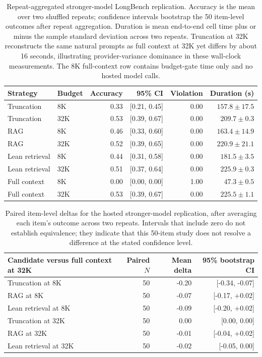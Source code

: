 \documentclass[11pt]{article}
\begin{document}
\begin{table}[t]
\centering
\small
\setlength{\tabcolsep}{3pt}
\begin{tabular}{llrrrr}
\toprule
Strategy & Budget & Accuracy & 95\% CI & Violation & Duration (s) \\
\midrule
Truncation & 8K & 0.33 & [0.21, 0.45] & 0.00 & $157.8 \pm 17.5$ \\
Truncation & 32K & 0.53 & [0.39, 0.67] & 0.00 & $209.7 \pm 0.3$ \\
RAG & 8K & 0.46 & [0.33, 0.60] & 0.00 & $163.4 \pm 14.9$ \\
RAG & 32K & 0.52 & [0.39, 0.65] & 0.00 & $220.9 \pm 21.1$ \\
Lean retrieval & 8K & 0.44 & [0.31, 0.58] & 0.00 & $181.5 \pm 3.5$ \\
Lean retrieval & 32K & 0.51 & [0.37, 0.64] & 0.00 & $225.9 \pm 0.3$ \\
Full context & 8K & 0.00 & [0.00, 0.00] & 1.00 & $47.3 \pm 0.5$ \\
Full context & 32K & 0.53 & [0.39, 0.67] & 0.00 & $225.5 \pm 1.1$ \\
\bottomrule
\end{tabular}
\caption{Repeat-aggregated stronger-model LongBench replication.  Accuracy is
the mean over two shuffled repeats; confidence intervals bootstrap the 50
item-level outcomes after repeat aggregation.  Duration is mean end-to-end
cell time plus or minus the sample standard deviation across two repeats.
Truncation at 32K reconstructs the same natural prompts as full context at 32K
yet differs by about 16 seconds, illustrating provider-variance dominance in
these wall-clock measurements.  The 8K full-context row contains budget-gate
time only and no hosted model calls.}
\label{tab:hosted_stronger_longbench}
\end{table}

\begin{table}[t]
\centering
\small
\begin{tabular}{lrrr}
\toprule
Candidate versus full context at 32K & Paired $N$ & Mean delta & 95\% bootstrap CI \\
\midrule
Truncation at 8K & 50 & -0.20 & [-0.34, -0.07] \\
RAG at 8K & 50 & -0.07 & [-0.17, +0.02] \\
Lean retrieval at 8K & 50 & -0.09 & [-0.20, +0.02] \\
Truncation at 32K & 50 & 0.00 & [0.00, 0.00] \\
RAG at 32K & 50 & -0.01 & [-0.04, +0.02] \\
Lean retrieval at 32K & 50 & -0.02 & [-0.05, 0.00] \\
\bottomrule
\end{tabular}
\caption{Paired item-level deltas for the hosted stronger-model replication,
after averaging each item's outcome across two repeats.  Intervals that include
zero do not establish equivalence; they indicate that this 50-item study does
not resolve a difference at the stated confidence level.}
\label{tab:hosted_stronger_longbench_deltas}
\end{table}
\end{document}
